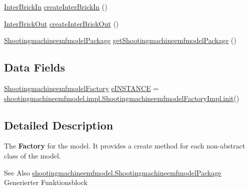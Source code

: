 \begin{DoxyCompactItemize}
\item 
\hyperlink{interfaceshootingmachineemfmodel_1_1_inter_brick_in}{Inter\-Brick\-In} \hyperlink{interfaceshootingmachineemfmodel_1_1_shootingmachineemfmodel_factory_ae5959cf224fa2772df564469d8709416}{create\-Inter\-Brick\-In} ()
\item 
\hyperlink{interfaceshootingmachineemfmodel_1_1_inter_brick_out}{Inter\-Brick\-Out} \hyperlink{interfaceshootingmachineemfmodel_1_1_shootingmachineemfmodel_factory_abb860402780a5fee560e10e2a1e41218}{create\-Inter\-Brick\-Out} ()
\item 
\hyperlink{interfaceshootingmachineemfmodel_1_1_shootingmachineemfmodel_package}{Shootingmachineemfmodel\-Package} \hyperlink{interfaceshootingmachineemfmodel_1_1_shootingmachineemfmodel_factory_a908ed8a192f1bd69ae8204381e765966}{get\-Shootingmachineemfmodel\-Package} ()
\end{DoxyCompactItemize}
\subsection*{Data Fields}
\begin{DoxyCompactItemize}
\item 
\hyperlink{interfaceshootingmachineemfmodel_1_1_shootingmachineemfmodel_factory}{Shootingmachineemfmodel\-Factory} \hyperlink{interfaceshootingmachineemfmodel_1_1_shootingmachineemfmodel_factory_a000cd4598703f054fa910e19bf287f87}{e\-I\-N\-S\-T\-A\-N\-C\-E} = \hyperlink{classshootingmachineemfmodel_1_1impl_1_1_shootingmachineemfmodel_factory_impl_ad0841c6b6e65880d7b7bcbb789a25bd0}{shootingmachineemfmodel.\-impl.\-Shootingmachineemfmodel\-Factory\-Impl.\-init}()
\end{DoxyCompactItemize}


\subsection{Detailed Description}
The {\bfseries Factory} for the model. It provides a create method for each non-\/abstract class of the model.

\begin{DoxySeeAlso}{See Also}
\hyperlink{interfaceshootingmachineemfmodel_1_1_shootingmachineemfmodel_package}{shootingmachineemfmodel.\-Shootingmachineemfmodel\-Package} Generierter Funktionsblock 
\end{DoxySeeAlso}


